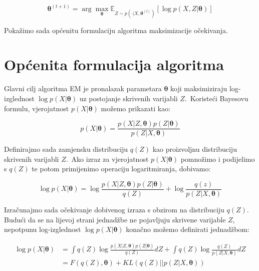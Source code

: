 \documentclass[diplomskirad]{fer}
\begin{document}
\begin{equation}
  \bm{\theta}^{(t + 1)} = \arg \max_{\bm{\theta}} \mathbb{E}_{Z \sim p(\cdot | X, \bm{\theta}^{(t)})} \left[ \log p(X, Z | \bm{\theta}) \right]
  \label{eq:em_alg_basic}
\end{equation}

Pokažimo sada općenitu formulaciju algoritma maksimizacije očekivanja.\

\section{Općenita formulacija algoritma}
\label{sek:general_em}

Glavni cilj algoritma EM je pronalazak parametara $\bm{\theta}$ koji maksimiziraju log-izglednost $\log p(X | \bm{\theta})$ uz postojanje skrivenih varijabli $Z$.\ Koristeći Bayesovu formulu, vjerojatnost $p(X | \bm{\theta})$ možemo prikazati kao:

\begin{equation}
  p(X | \bm{\theta}) = \frac{p(X | Z, \bm{\theta}) p(Z | \bm{\theta})}{p(Z | X, \bm{\theta})}
  \label{eq:em_bayes}
\end{equation}

\pagebreak

Definirajmo sada zamjensku distribuciju $q(Z)$ kao proizvoljnu distribuciju skrivenih varijabli $Z$.\ Ako izraz za vjerojatnost $p(X | \bm{\theta})$ pomnožimo i podijelimo s $q(Z)$ te potom primijenimo operaciju logaritmiranja, dobivamo:

\begin{equation}
  \log p(X | \bm{\theta}) = \log \frac{p(X | Z, \bm{\theta}) p(Z | \bm{\theta})}{q(Z)} + \log \frac{q(z)}{p(Z | X, \bm{\theta})}
  \label{eq:em_log}
\end{equation}

Izračunajmo sada očekivanje dobivenog izraza s obzirom na distribuciju $q(Z)$. Budući da se na lijevoj strani jednadžbe ne pojavljuju skrivene varijable $Z$, nepotpunu log-izglednost $\log p(X | \bm{\theta})$ konačno možemo definirati jednadžbom:

\begin{equation}
  \begin{aligned}
    \log p(X | \bm{\theta}) &= \int q(Z) \log \frac{p(X | Z, \bm{\theta}) p(Z | \bm{\theta})}{q(Z)} dZ + \int q(Z) \log \frac{q(Z)}{p(Z | X, \bm{\theta})} dZ \\
                            &= F(q(Z), \bm{\theta}) + KL(q(Z) || p(Z | X, \bm{\theta}))
  \end{aligned}
  \label{eq:em_general_form}
\end{equation}
\end{document}
